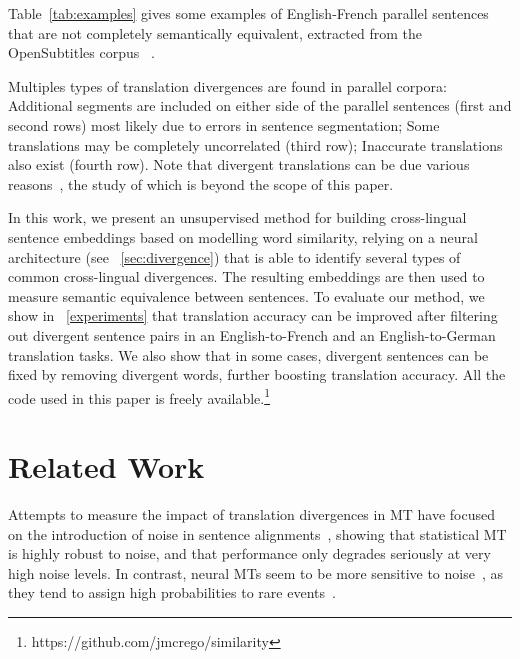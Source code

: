 \documentclass[11pt,a4paper]{article}
\begin{document}
Table~\ref{tab:examples} gives some examples of English-French parallel sentences that are not completely semantically equivalent, extracted from the OpenSubtitles corpus ~\cite{LisonTiedemann2016}. 

Multiples types of translation divergences are found in parallel corpora:
Additional segments are included on either side of the parallel sentences (first and second rows) most likely due to errors in sentence segmentation;
Some translations may be completely uncorrelated (third row);
Inaccurate translations also exist (fourth row). 
Note that divergent translations can be due various reasons~\cite{C14-1055}, the study of which is beyond the scope of this paper. 

In this work, we present an unsupervised method for building cross-lingual sentence embeddings based on modelling word similarity,  %
relying on a neural architecture (see \textsection~\ref{sec:divergence}) that is able to identify several types of common cross-lingual divergences. %
The resulting embeddings are then used to measure semantic equivalence between sentences.
To evaluate our method, we show in \textsection~\ref{experiments} that translation accuracy can be improved after filtering out divergent sentence pairs in an English-to-French and an English-to-German translation tasks.
We also show that in some cases, divergent sentences can be fixed by removing divergent words, further boosting translation accuracy. All the code used in this paper is freely available.\footnote{https://github.com/jmcrego/similarity}


\section{Related Work}
\label{related}

Attempts to measure the impact of translation divergences in MT have focused on the introduction of noise in sentence alignments~\cite{goute2012}, showing that statistical MT is highly robust to noise, and that performance only degrades seriously at very high noise levels.  In contrast, neural MTs seem to be more sensitive to noise~\cite{chen2016adaptation}, as they tend to assign high probabilities to rare events~\cite{Hassan2018AchievingHP}.
\end{document}
